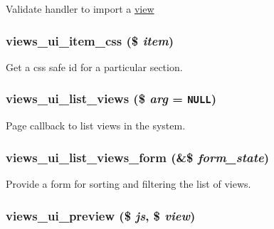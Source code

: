 Validate handler to import a \hyperlink{classview}{view} \hypertarget{admin_8inc_f6b6dd299deaebad2b2bb09dc78afab3}{
\subsubsection[{views\_\-ui\_\-item\_\-css}]{\setlength{\rightskip}{0pt plus 5cm}views\_\-ui\_\-item\_\-css (\$ {\em item})}}
\label{admin_8inc_f6b6dd299deaebad2b2bb09dc78afab3}


Get a css safe id for a particular section. \hypertarget{admin_8inc_aab40d1cdd76cf120dd01aa63a3944e9}{
\subsubsection[{views\_\-ui\_\-list\_\-views}]{\setlength{\rightskip}{0pt plus 5cm}views\_\-ui\_\-list\_\-views (\$ {\em arg} = {\tt NULL})}}
\label{admin_8inc_aab40d1cdd76cf120dd01aa63a3944e9}


Page callback to list views in the system. \hypertarget{admin_8inc_3f7e4656b6cc3f6b246e20a044f09504}{
\subsubsection[{views\_\-ui\_\-list\_\-views\_\-form}]{\setlength{\rightskip}{0pt plus 5cm}views\_\-ui\_\-list\_\-views\_\-form (\&\$ {\em form\_\-state})}}
\label{admin_8inc_3f7e4656b6cc3f6b246e20a044f09504}


Provide a form for sorting and filtering the list of views. \hypertarget{admin_8inc_82e72453c3ff3f251677786b58bb66ec}{
\subsubsection[{views\_\-ui\_\-preview}]{\setlength{\rightskip}{0pt plus 5cm}views\_\-ui\_\-preview (\$ {\em js}, \/  \$ {\em view})}}
\label{admin_8inc_82e72453c3ff3f251677786b58bb66ec}


